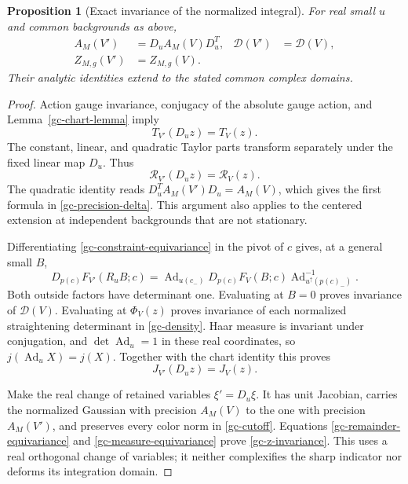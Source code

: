 \documentclass[11pt]{article}
\newtheorem{proposition}[theorem]{Proposition}
\theoremstyle{remark}
\begin{document}
\begin{proposition}[Exact invariance of the normalized integral]
\label{gc-integral-proposition}
For real small $u$ and common backgrounds as above,
\begin{align}
 A_M(V')&=D_u A_M(V)D_u^T,&
 \mathcal D(V')&=\mathcal D(V),                           \label{gc-precision-delta}\\
 Z_{M,g}(V')&=Z_{M,g}(V).                                \label{gc-z-invariance}
\end{align}
Their analytic identities extend to the stated common complex domains.
\end{proposition}
\begin{proof}
Action gauge invariance, conjugacy of the absolute gauge action,
and Lemma~\ref{gc-chart-lemma} imply
\begin{equation}\label{gc-scalar-action-equivariance}
 T_{V'}(D_uz)=T_V(z).
\end{equation}
The constant, linear, and quadratic Taylor parts transform
separately under the fixed linear map $D_u$. Thus
\begin{equation}\label{gc-remainder-equivariance}
 \mathcal R_{V'}(D_uz)=\mathcal R_V(z).
\end{equation}
The quadratic identity reads $D_u^T A_M(V')D_u=A_M(V)$,
which gives the first formula in \eqref{gc-precision-delta}.
This argument also applies to the centered extension at independent
backgrounds that are not stationary.

Differentiating \eqref{gc-constraint-equivariance} in the pivot of
$c$ gives, at a general small $B$,
\begin{equation}\label{gc-pivot-equivariance}
 D_{p(c)}F_{V'}(R_uB;c)=
 \operatorname{Ad}_{u(c_-)}
 D_{p(c)}F_V(B;c)
 \operatorname{Ad}_{u^\uparrow(p(c)_-)}^{-1}.
\end{equation}
Both outside factors have determinant one. Evaluating at $B=0$
proves invariance of $\mathcal D(V)$. Evaluating at $\Phi_V(z)$
proves invariance of each normalized straightening determinant
in \eqref{gc-density}. Haar measure is invariant under conjugation,
and $\det\operatorname{Ad}_u=1$ in these real coordinates, so
$j(\operatorname{Ad}_uX)=j(X)$. Together with the chart identity
this proves
\begin{equation}\label{gc-measure-equivariance}
 J_{V'}(D_uz)=J_V(z).
\end{equation}

Make the real change of retained variables $\xi'=D_u\xi$.
It has unit Jacobian, carries the normalized Gaussian with
precision $A_M(V)$ to the one with precision $A_M(V')$, and
preserves every color norm in \eqref{gc-cutoff}. Equations
\eqref{gc-remainder-equivariance} and
\eqref{gc-measure-equivariance} prove \eqref{gc-z-invariance}.
This uses a real orthogonal change of variables; it neither
complexifies the sharp indicator nor deforms its integration domain.


\end{proof}
\end{document}
